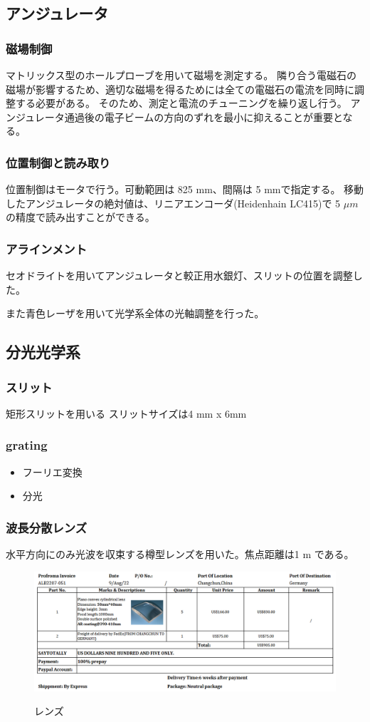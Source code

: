 \documentclass[a4paper,11pt,uplatex]{jsbook}
\begin{document}
\subsection{アンジュレータ}
\subsubsection{磁場制御}
マトリックス型のホールプローブを用いて磁場を測定する。
隣り合う電磁石の磁場が影響するため、適切な磁場を得るためには全ての電磁石の電流を同時に調整する必要がある。
そのため、測定と電流のチューニングを繰り返し行う。
アンジュレータ通過後の電子ビームの方向のずれを最小に抑えることが重要となる。

\subsubsection{位置制御と読み取り}
位置制御はモータで行う。可動範囲は 825 mm、間隔は 5 mmで指定する。
移動したアンジュレータの絶対値は、リニアエンコーダ(Heidenhain LC415)で 5 $\mu m$ の精度で読み出すことができる。
\subsubsection{アラインメント}
セオドライトを用いてアンジュレータと較正用水銀灯、スリットの位置を調整した。

また青色レーザを用いて光学系全体の光軸調整を行った。
\subsection{分光光学系}
\subsubsection{スリット}
矩形スリットを用いる
スリットサイズは4 mm x 6mm
\subsubsection{grating}
\begin{itemize}
  \item フーリエ変換
  \item 分光
\end{itemize}

\subsubsection{波長分散レンズ}
水平方向にのみ光波を収束する樽型レンズを用いた。焦点距離は1 m である。
\begin{figure}[tb]
  \centering
  \includegraphics[width=0.8\linewidth]{image/3-lens.png}\\
  \caption{レンズ}
  \label{lens}
\end{figure}
\end{document}
